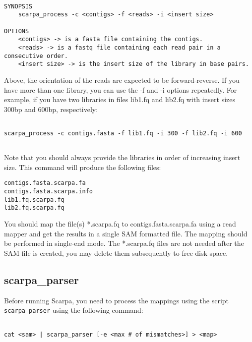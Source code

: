 \documentclass[12pt,a4paper]{report}
\begin{document}
\begin{lstlisting}

SYNOPSIS
    scarpa_process -c <contigs> -f <reads> -i <insert size>

OPTIONS
    <contigs> -> is a fasta file containing the contigs.
    <reads> -> is a fastq file containing each read pair in a consecutive order.
    <insert size> -> is the insert size of the library in base pairs.

\end{lstlisting}

Above, the orientation of the reads are expected to be forward-reverse. If you have more than one library, you can use the -f and -i options repeatedly. For example, if you have two libraries in files lib1.fq and lib2.fq with insert sizes 300bp and 600bp, respectively:

\begin{lstlisting}

scarpa_process -c contigs.fasta -f lib1.fq -i 300 -f lib2.fq -i 600


\end{lstlisting}

Note that you should always provide the libraries in order of increasing insert size. This command will produce the following files:

\begin{lstlisting}
contigs.fasta.scarpa.fa
contigs.fasta.scarpa.info
lib1.fq.scarpa.fq
lib2.fq.scarpa.fq
\end{lstlisting}

You should map the file(s) *.scarpa.fq to contigs.fasta.scarpa.fa using a read mapper and get the results in a single SAM formatted file. The mapping should be performed in single-end mode. The *.scarpa.fq files are not needed after the SAM file is created, you may delete them subsequently to free disk space.

\subsection{scarpa\_parser}

Before running Scarpa, you need to process the mappings using the script \texttt{scarpa\_parser} using the following command:

\begin{lstlisting}

cat <sam> | scarpa_parser [-e <max # of mismatches>] > <map>

\end{lstlisting}
\end{document}
